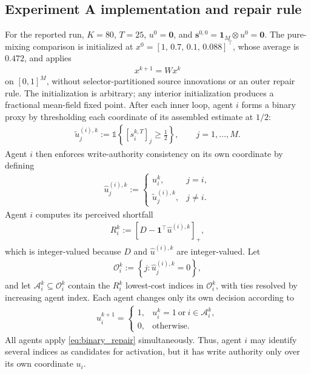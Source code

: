 \documentclass[letterpaper, 10 pt, conference]{ieeeconf} %
\begin{document}
\subsection{Experiment A implementation and repair rule}
For the reported run, \(K=80\), \(T=25\), \(u^0=\mathbf0\), and \(\mathbf s^{0,0}=\mathbf1_M\otimes u^0=\mathbf0\). The pure-mixing comparison is initialized at \(x^0=[1,\,0.7,\,0.1,\,0.088]^\top\), whose average is \(0.472\), and applies
\begin{align}
x^{k+1}=Wx^k
\end{align}
on \([0,1]^M\), without selector-partitioned source innovations or an outer repair rule. The initialization is arbitrary; any interior initialization produces a fractional mean-field fixed point. After each inner loop, agent \(i\) forms a binary proxy by thresholding each coordinate of its assembled estimate at \(1/2\):
\begin{align}
\tilde u_j^{(i),k}
:=
\mathds{1}\!\left\{
[s_i^{k,T}]_j\ge \frac12
\right\},
\qquad j=1,\ldots,M.
\end{align}
Agent \(i\) then enforces write-authority consistency on its own coordinate by defining
\begin{align}
\hat u_j^{(i),k}
:=
\begin{cases}
u_i^k, & j=i,\\
\tilde u_j^{(i),k}, & j\neq i.
\end{cases}
\end{align}
Agent \(i\) computes its perceived shortfall
\begin{align}
R_i^k
:=
\left[D-\mathbf 1^\top\hat u^{(i),k}\right]_+,
\end{align}
which is integer-valued because \(D\) and \(\hat u^{(i),k}\) are integer-valued. Let
\begin{align}
\mathcal O_i^k
:=
\left\{
j:\hat u_j^{(i),k}=0
\right\},
\end{align}
and let \(\mathcal A_i^k\subseteq\mathcal O_i^k\) contain the \(R_i^k\) lowest-cost indices in \(\mathcal O_i^k\), with ties resolved by increasing agent index. Each agent changes only its own decision according to
\begin{align}
u_i^{k+1}
=
\begin{cases}
1,
& u_i^k=1\ \text{or}\ i\in\mathcal A_i^k,\\
0,
& \text{otherwise}.
\end{cases}
\label{eq:binary_repair}
\end{align}
All agents apply \eqref{eq:binary_repair} simultaneously. Thus, agent \(i\) may identify several indices as candidates for activation, but it has write authority only over its own coordinate \(u_i\).
\end{document}
